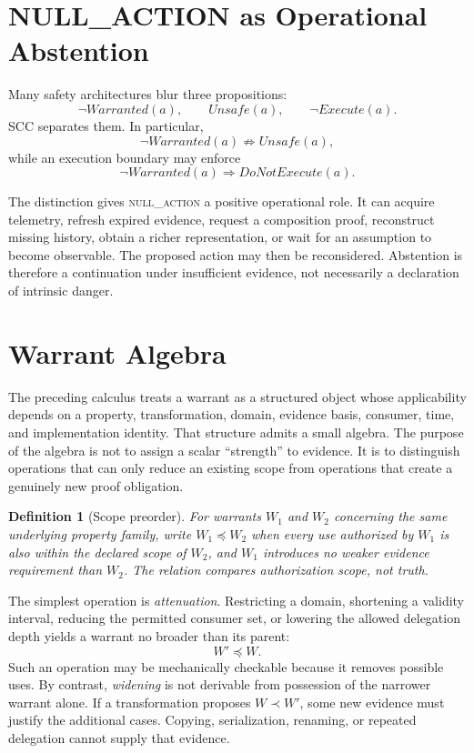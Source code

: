 \documentclass[11pt]{article}
\newtheorem{definition}{Definition}
\newcommand{\nullaction}{\textsc{null\_action}}
\begin{document}
\section{NULL\_ACTION as Operational Abstention}
Many safety architectures blur three propositions:
\[
\neg Warranted(a),\qquad Unsafe(a),\qquad \neg Execute(a).
\]
SCC separates them. In particular,
\[
\neg Warranted(a)\not\Rightarrow Unsafe(a),
\]
while an execution boundary may enforce
\[
\neg Warranted(a)\Rightarrow DoNotExecute(a).
\]

The distinction gives \nullaction{} a positive operational role. It can acquire telemetry, refresh expired evidence, request a composition proof, reconstruct missing history, obtain a richer representation, or wait for an assumption to become observable. The proposed action may then be reconsidered. Abstention is therefore a continuation under insufficient evidence, not necessarily a declaration of intrinsic danger.


\section{Warrant Algebra}
The preceding calculus treats a warrant as a structured object whose applicability depends on a property, transformation, domain, evidence basis, consumer, time, and implementation identity. That structure admits a small algebra. The purpose of the algebra is not to assign a scalar ``strength'' to evidence. It is to distinguish operations that can only reduce an existing scope from operations that create a genuinely new proof obligation.

\begin{definition}[Scope preorder]
For warrants $W_1$ and $W_2$ concerning the same underlying property family, write $W_1\preceq W_2$ when every use authorized by $W_1$ is also within the declared scope of $W_2$, and $W_1$ introduces no weaker evidence requirement than $W_2$. The relation compares authorization scope, not truth.
\end{definition}

The simplest operation is \emph{attenuation}. Restricting a domain, shortening a validity interval, reducing the permitted consumer set, or lowering the allowed delegation depth yields a warrant no broader than its parent:
\[
W'\preceq W.
\]
Such an operation may be mechanically checkable because it removes possible uses. By contrast, \emph{widening} is not derivable from possession of the narrower warrant alone. If a transformation proposes $W\prec W'$, some new evidence must justify the additional cases. Copying, serialization, renaming, or repeated delegation cannot supply that evidence.
\end{document}
